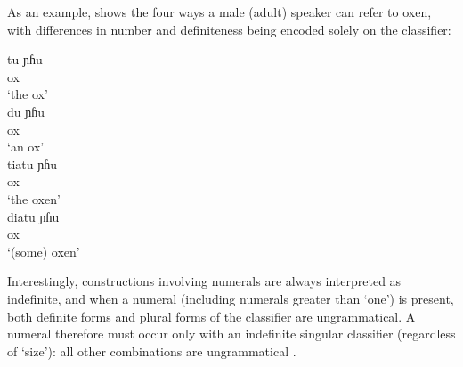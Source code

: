 \documentclass[output=paper
,modfonts
,nonflat]{langsci/langscibook}
\begin{document}
As an example,  shows the four ways a male (adult) speaker can  refer to oxen, with differences in number and definiteness being encoded solely on the classifier:

\ea \label{ex:hall:24}

\ea
\gll
tu ɲɦu\\
{} ox\\
\glt
`the ox'\\

\ex
\gll
du ɲɦu\\
{} ox\\
\glt
`an ox'\\

\ex 
\gll
tiatu ɲɦu\\
{} ox\\
\glt
`the oxen'\\

\ex 
\gll
diatu ɲɦu\\
{} ox\\
\glt
`(some) oxen'\\
\z
\z

Interestingly, constructions involving numerals are always interpreted as indefinite, and when a numeral (including numerals greater than `one') is present, both definite forms and plural forms of the classifier are ungrammatical. A numeral therefore must occur only with an indefinite singular classifier (regardless of `size'): all other combinations are ungrammatical \citep[588]{GernerBisang2010}.

\ea 
{}

\z
\z 

\ea 
{}
\z 
\z 
\end{document}
